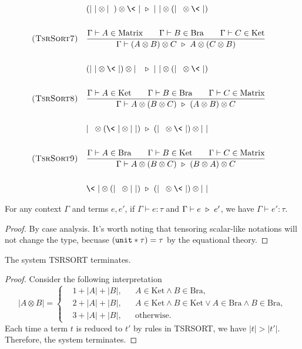 \begin{align*}
  \\
  & && (|\ | \otimes |\ \>) \otimes \<\ | \reduce |\ | \otimes (|\ \> \otimes \<\ |) \\
  \\
  & \textsc{(TsrSort7)} &&
  \frac{\Gamma \vdash A \in \textrm{Matrix} \qquad \Gamma \vdash B \in \textrm{Bra} \qquad \Gamma \vdash C \in \textrm{Ket}}{\Gamma \vdash (A \otimes B) \otimes C \reduce A \otimes (C \otimes B)} \\
  \\
  & && (|\ | \otimes \<\ |) \otimes |\ \> \reduce |\ | \otimes (|\ \> \otimes \<\ |) \\
  \\
  & \textsc{(TsrSort8)} &&
  \frac{\Gamma \vdash A \in \textrm{Ket} \qquad \Gamma \vdash B \in \textrm{Bra} \qquad \Gamma \vdash C \in \textrm{Matrix}}{\Gamma \vdash A \otimes (B \otimes C) \reduce (A \otimes B) \otimes C} \\
  \\
  & && |\ \> \otimes (\<\ | \otimes |\ |) \reduce (|\ \> \otimes \<\ |) \otimes |\ | \\
  \\
  & \textsc{(TsrSort9)} &&
  \frac{\Gamma \vdash A \in \textrm{Bra} \qquad \Gamma \vdash B \in \textrm{Ket} \qquad \Gamma \vdash C \in \textrm{Matrix}}{\Gamma \vdash A \otimes (B \otimes C) \reduce (B \otimes A) \otimes C} \\
  \\
  & && \<\ | \otimes (|\ \> \otimes |\ |) \reduce (|\ \> \otimes \<\ |) \otimes |\ | \\  
\end{align*}

\begin{lemma}
  For any context $\Gamma$ and terms $e, e'$, if $\Gamma \vdash e : \tau$ and $\Gamma \vdash e \ \triangleright\  e'$, we have
  $ \Gamma \vdash e' : \tau $. 
\end{lemma}
\begin{proof}
  By case analysis. It's worth noting that tensoring scalar-like notations will not change the type, becuase $(\texttt{unit} * \tau) = \tau$ by the equational theory.
\end{proof}

\begin{proposition}
  The system \textsf{TSRSORT} terminates.
\end{proposition}
\begin{proof}
  Consider the following interpretation
  $$
  | A \otimes B | = \left \{
    \begin{aligned}
      & 1 + | A | + | B |, && A \in \textrm{Ket} \wedge B \in \textrm{Bra}, \\
      & 2 + | A | + | B |, && A \in \textrm{Ket} \wedge B \in \textrm{Ket} \vee A \in \textrm{Bra} \wedge B \in \textrm{Bra}, \\
      & 3 + | A | + | B |, && \textrm{otherwise}.
    \end{aligned}
  \right .
  $$
  Each time a term $t$ is reduced to $t'$ by rules in \textsf{TSRSORT}, we have $|t| > |t'|$. Therefore, the system terminates.
\end{proof}



